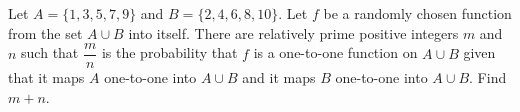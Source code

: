 Let $A = \{1,3,5,7,9\}$ and $B = \{2,4,6,8,10\}$. Let $f$ be a randomly chosen function from the set $A\cup B$ into itself. There are relatively prime positive integers $m$ and $n$ such that $\dfrac{m}{n}$ is the probability that $f$ is a one-to-one function on $A\cup B$ given that it maps $A$ one-to-one into $A\cup B$ and it maps $B$ one-to-one into $A\cup B$. Find $m + n$.
